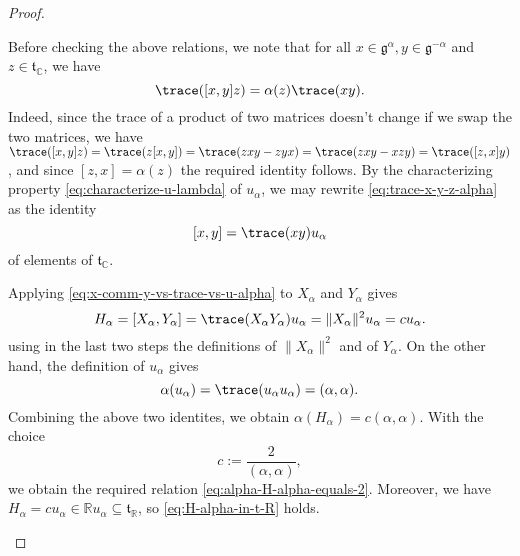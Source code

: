 \documentclass[reqno]{amsart} 
\begin{document}
\begin{proof}
\begin{enumerate}
    Before checking the above relations, we note that for all $x \in \mathfrak{g}^{\alpha}, y \in \mathfrak{g}^{-\alpha}$ and $z \in \mathfrak{t}_{\mathbb{C}}$, we have
    \begin{equation}\label{eq:trace-x-y-z-alpha}
      \trace([x,y] z) = \alpha(z) \trace(x y).
    \end{equation}
    Indeed, since the trace of a product of two matrices doesn't change if we swap the two matrices, we have $\trace([x,y] z) = \trace(z[x,y]) = \trace(z x y - z y x) = \trace(z x y - x z y) = \trace([z,x] y)$, and since $[z,x] = \alpha(z)$ the required identity follows.  By the characterizing property \eqref{eq:characterize-u-lambda} of $u_\alpha$, we may rewrite \eqref{eq:trace-x-y-z-alpha} as the identity
    \begin{equation}\label{eq:x-comm-y-vs-trace-vs-u-alpha}
      [x,y] = \trace(x y) u_\alpha
    \end{equation}
    of elements of $\mathfrak{t}_{\mathbb{C}}$.

    Applying \eqref{eq:x-comm-y-vs-trace-vs-u-alpha} to $X_\alpha$ and $Y_\alpha$ gives
    \begin{equation}\label{eq:}
      H_\alpha = [X_\alpha, Y_\alpha ]
      = \trace(X_\alpha Y_\alpha) u_\alpha
      = \|X_\alpha \|^2 u_\alpha
      = c u_\alpha.
    \end{equation}
    using in the last two steps the definitions of $\|X_\alpha \|^2$ and of $Y_\alpha$.  On the other hand, the definition of $u_\alpha$ gives
    \begin{equation}\label{eq:}
      \alpha(u_\alpha) = \trace(u_\alpha u_\alpha)
      = (\alpha,\alpha).
    \end{equation}
    Combining the above two identites, we obtain $\alpha(H_\alpha) = c (\alpha,\alpha)$.  With the choice
    \begin{equation}\label{eq:definition-of-c-equals-2-over-alpha-alpha}
      c := \frac{2}{(\alpha,\alpha)},
    \end{equation}
    we obtain the required relation \eqref{eq:alpha-H-alpha-equals-2}.  Moreover, we have $H_\alpha = c u_\alpha \in \mathbb{R} u_\alpha \subseteq \mathfrak{t}_{\mathbb{R}}$, so \eqref{eq:H-alpha-in-t-R} holds.


\end{enumerate}
\end{proof}
\end{document}
